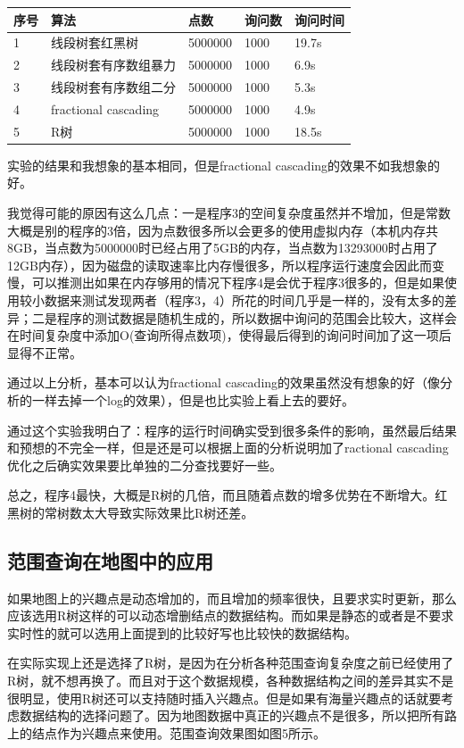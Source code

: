 \documentclass[10pt]{scrartcl}
\begin{document}
\begin{tabular}{|l|l|l|l|l|}
\hline
序号 & 算法 & 点数 & 询问数 & 询问时间 \\
\hline
1   & 线段树套红黑树 & 5000000 & 1000 & 19.7s \\
\hline
2   & 线段树套有序数组暴力 & 5000000 & 1000 & 6.9s \\
\hline
3   & 线段树套有序数组二分 & 5000000 & 1000 & 5.3s \\
\hline
4   & fractional cascading & 5000000 & 1000 & 4.9s \\
\hline
5   & R树 & 5000000 & 1000 & 18.5s \\
\hline
\end{tabular}

实验的结果和我想象的基本相同，但是fractional cascading的效果不如我想象的好。

我觉得可能的原因有这么几点：一是程序3的空间复杂度虽然并不增加，但是常数大概是别的程序的3倍，因为点数很多所以会更多的使用虚拟内存（本机内存共8GB，当点数为5000000时已经占用了5GB的内存，当点数为13293000时占用了12GB内存），因为磁盘的读取速率比内存慢很多，所以程序运行速度会因此而变慢，可以推测出如果在内存够用的情况下程序4是会优于程序3很多的，但是如果使用较小数据来测试发现两者（程序3，4）所花的时间几乎是一样的，没有太多的差异；二是程序的测试数据是随机生成的，所以数据中询问的范围会比较大，这样会在时间复杂度中添加O(查询所得点数项)，使得最后得到的询问时间加了这一项后显得不正常。

通过以上分析，基本可以认为fractional cascading的效果虽然没有想象的好（像分析的一样去掉一个log的效果），但是也比实验上看上去的要好。

通过这个实验我明白了：程序的运行时间确实受到很多条件的影响，虽然最后结果和预想的不完全一样，但是还是可以根据上面的分析说明加了ractional cascading优化之后确实效果要比单独的二分查找要好一些。

总之，程序4最快，大概是R树的几倍，而且随着点数的增多优势在不断增大。红黑树的常树数太大导致实际效果比R树还差。

\subsection{范围查询在地图中的应用}
如果地图上的兴趣点是动态增加的，而且增加的频率很快，且要求实时更新，那么应该选用R树这样的可以动态增删结点的数据结构。而如果是静态的或者是不要求实时性的就可以选用上面提到的比较好写也比较快的数据结构。

在实际实现上还是选择了R树，是因为在分析各种范围查询复杂度之前已经使用了R树，就不想再换了。而且对于这个数据规模，各种数据结构之间的差异其实不是很明显，使用R树还可以支持随时插入兴趣点。但是如果有海量兴趣点的话就要考虑数据结构的选择问题了。因为地图数据中真正的兴趣点不是很多，所以把所有路上的结点作为兴趣点来使用。范围查询效果图如图5所示。
\end{document}
